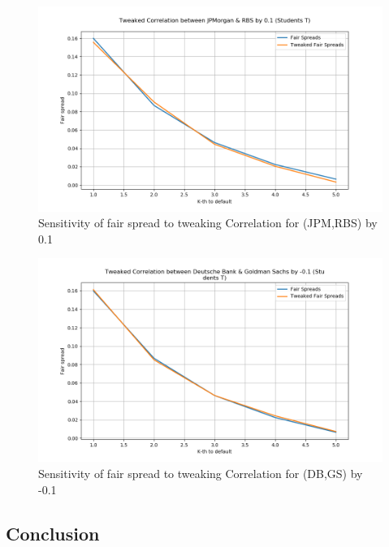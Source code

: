 \documentclass{report}
\theoremstyle{plain}
\theoremstyle{definition}
\begin{document}
\begin{figure}[H]
	\begin{center}
		\includegraphics[width=15cm]{Tweaked_Correlation_between_JPMorgan_&_RBS_by_0,1_(Students_T).png}
		\caption{Sensitivity of fair spread to tweaking Correlation for (JPM,RBS) by 0.1} 
		\label{Tweaked_Correlation_between_JPMorgan_&_RBS_by_0.1_(Students_T)}
	\end{center}
\end{figure}

\begin{figure}[H]
	\begin{center}
		\includegraphics[width=15cm]{Tweaked_Correlation_between_Deutsche_Bank_&_Goldman_Sachs_by_-0,1_(Students_T)}
		\caption{Sensitivity of fair spread to tweaking Correlation for (DB,GS) by -0.1} 
		\label{Tweaked_Correlation_between_Deutsche_Bank_&_Goldman_Sachs_by_-0.1_(Students_T)}
	\end{center}
\end{figure}

\subsection*{Conclusion}
\end{document}
